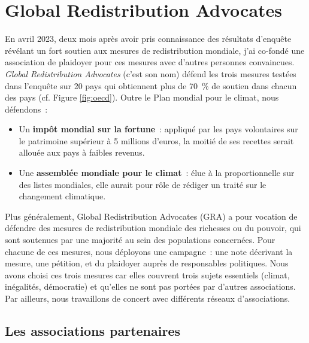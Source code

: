 \documentclass[a5paper,french,openany]{memoir}
\begin{document}
\section{Global Redistribution Advocates}

En avril 2023, deux mois après avoir pris connaissance des résultats d'enquête révélant un fort soutien aux mesures de redistribution mondiale, j'ai co-fondé une association de plaidoyer pour ces mesures avec d'autres personnes convaincues. \textit{Global Redistribution Advocates} (c'est son nom) défend les trois mesures testées dans l'enquête sur 20 pays qui obtiennent plus de 70~\% de soutien dans chacun des pays (cf. Figure \ref{fig:oecd}). Outre le Plan mondial pour le climat, nous défendons~: 
\begin{itemize}
  \item Un \textbf{impôt mondial sur la fortune}~: appliqué par les pays volontaires sur le patrimoine supérieur à 5 millions d'euros, la moitié de ses recettes serait allouée aux pays à faibles revenus.
  \item Une \textbf{assemblée mondiale pour le climat}~: élue à la proportionnelle sur des listes mondiales, elle aurait pour rôle de rédiger un traité sur le changement climatique.
\end{itemize}

Plus généralement, Global Redistribution Advocates (GRA) a pour vocation de défendre des mesures de redistribution mondiale des richesses ou du pouvoir, qui sont soutenues par une majorité au sein des populations concernées. Pour chacune de ces mesures, nous déployons une campagne~: une note décrivant la mesure, une pétition, et du plaidoyer auprès de responsables politiques. Nous avons choisi ces trois mesures car elles couvrent trois sujets essentiels (climat, inégalités, démocratie) et qu'elles ne sont pas portées par d'autres associations. Par ailleurs, nous travaillons de concert avec différents réseaux d'associations. 

\subsection{Les associations partenaires}
\end{document}
